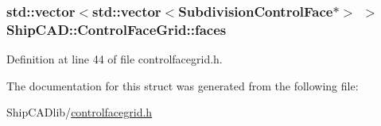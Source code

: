 \subsubsection[{\texorpdfstring{faces}{faces}}]{\setlength{\rightskip}{0pt plus 5cm}std\+::vector$<$std\+::vector$<${\bf Subdivision\+Control\+Face}$\ast$$>$ $>$ Ship\+C\+A\+D\+::\+Control\+Face\+Grid\+::faces}\hypertarget{structShipCAD_1_1ControlFaceGrid_aa040d7465260af92995eff9ef7623984}{}\label{structShipCAD_1_1ControlFaceGrid_aa040d7465260af92995eff9ef7623984}


Definition at line 44 of file controlfacegrid.\+h.



The documentation for this struct was generated from the following file\+:\begin{DoxyCompactItemize}
\item 
Ship\+C\+A\+Dlib/\hyperlink{controlfacegrid_8h}{controlfacegrid.\+h}\end{DoxyCompactItemize}
